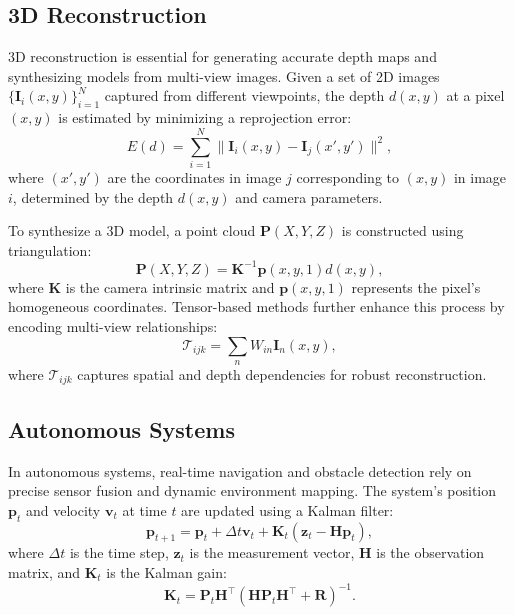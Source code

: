\documentclass{article}
\theoremstyle{plain}
\begin{document}
\subsection{3D Reconstruction}
3D reconstruction is essential for generating accurate depth maps and synthesizing models from multi-view images. Given a set of 2D images \( \{\mathbf{I}_i(x, y)\}_{i=1}^N \) captured from different viewpoints, the depth \( d(x, y) \) at a pixel \( (x, y) \) is estimated by minimizing a reprojection error:
\begin{equation}
E(d) = \sum_{i=1}^N \| \mathbf{I}_i(x, y) - \mathbf{I}_j(x', y') \|^2,
\end{equation}
where \( (x', y') \) are the coordinates in image \( j \) corresponding to \( (x, y) \) in image \( i \), determined by the depth \( d(x, y) \) and camera parameters.

To synthesize a 3D model, a point cloud \( \mathbf{P}(X, Y, Z) \) is constructed using triangulation:
\begin{equation}
\mathbf{P}(X, Y, Z) = \mathbf{K}^{-1} \mathbf{p}(x, y, 1) d(x, y),
\end{equation}
where \( \mathbf{K} \) is the camera intrinsic matrix and \( \mathbf{p}(x, y, 1) \) represents the pixel's homogeneous coordinates. Tensor-based methods further enhance this process by encoding multi-view relationships:
\begin{equation}
\mathcal{T}_{ijk} = \sum_{n} W_{in} \mathbf{I}_n(x, y),
\end{equation}
where \( \mathcal{T}_{ijk} \) captures spatial and depth dependencies for robust reconstruction.

\subsection{Autonomous Systems}
In autonomous systems, real-time navigation and obstacle detection rely on precise sensor fusion and dynamic environment mapping. The system’s position \( \mathbf{p}_t \) and velocity \( \mathbf{v}_t \) at time \( t \) are updated using a Kalman filter:
\begin{equation}
\mathbf{p}_{t+1} = \mathbf{p}_t + \Delta t \mathbf{v}_t + \mathbf{K}_t (\mathbf{z}_t - \mathbf{H} \mathbf{p}_t),
\end{equation}
where \( \Delta t \) is the time step, \( \mathbf{z}_t \) is the measurement vector, \( \mathbf{H} \) is the observation matrix, and \( \mathbf{K}_t \) is the Kalman gain:
\begin{equation}
\mathbf{K}_t = \mathbf{P}_t \mathbf{H}^\top (\mathbf{H} \mathbf{P}_t \mathbf{H}^\top + \mathbf{R})^{-1}.
\end{equation}
\end{document}
